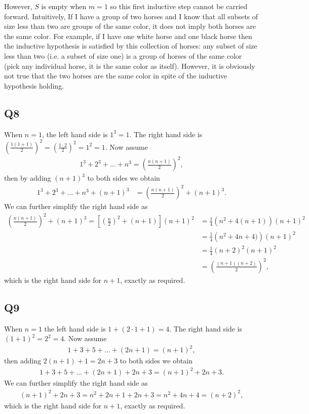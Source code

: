 \documentclass[12pt]{article}
\numberwithin{theorem}{section}
\numberwithin{equation}{section}
\numberwithin{remark}{section}
\numberwithin{definition}{section}
\numberwithin{theorem}{section}
\numberwithin{lemma}{section}
\numberwithin{example}{section}
\begin{document}
However, $S$ is empty when $m=1$ so this first inductive step cannot be carried forward. Intuitively, If I have a group of two horses and I know that all subsets of size less than two are groups of the same color, it does not imply both horses are the same color. For example, if I have one white horse and one black horse then the inductive hypothesis is satisfied by this collection of horses: any subset of size less than two (i.e. a subset of size one) is a group of horses of the same color (pick any individual horse, it is the same color as itself). However, it is obviously not true that the two horses are the same color in spite of the inductive hypothesis holding. 



\subsection{Q8}

When $n=1$, the left hand side is $1^3=1$. The right hand side is $\left(\frac{1(1+1)}{2}\right)^2=\left(\frac{1\cdot2}{2}\right)^2=1^2=1$. Now assume
\begin{align*}
	1^3 + 2^3 + \ldots + n^3 = \left(\frac{n(n+1)}{2}\right)^2,
\end{align*}
then by adding $(n+1)^3$ to both sides we obtain
\begin{align*}
	1^3 + 2^3 + \ldots + n^3 + (n+1)^3&= \left(\frac{n(n+1)}{2}\right)^2 + (n+1)^3.
\end{align*}
We can further simplify the right hand side as
\begin{align*}
	 \left(\frac{n(n+1)}{2}\right)^2 + (n+1)^3 = \left[\left(\frac{n}{2}\right)^2 + (n+1)\right](n+1)^2 & = \frac{1}{4}\left(n^2 + 4(n+1)\right)(n+1)^2 \\
	 & = \frac{1}{4}\left(n^2 + 4n+4)\right)(n+1)^2 \\
	 & = \frac{1}{4}(n+2)^2(n+1)^2\\
	 & = \left(\frac{(n+1)(n+2)}{2}\right)^2,
\end{align*}
which is the right hand side for $n+1$, exactly as required.



\subsection{Q9}

When $n=1$ the left hand side is $1+(2\cdot1+1)=4$. The right hand side is $(1+1)^2=2^2=4$. Now assume
\begin{align*}
	1 + 3 + 5 + \ldots + (2n+1) = (n+1)^2,
\end{align*}
then adding $2(n+1)+1=2n+3$ to both sides we obtain 
\begin{align*}
	1 + 3 + 5 + \ldots + (2n+1) + 2n+3 = (n+1)^2 + 2n+3.
\end{align*}
We can further simplify the right hand side as 
\begin{align*}
	(n+1)^2 + 2n+3 = n^2 + 2n + 1 + 2n + 3 = n^2 + 4n + 4 = (n+2)^2, 
\end{align*}
which is the right hand side for $n+1$, exactly as required. 
\end{document}
